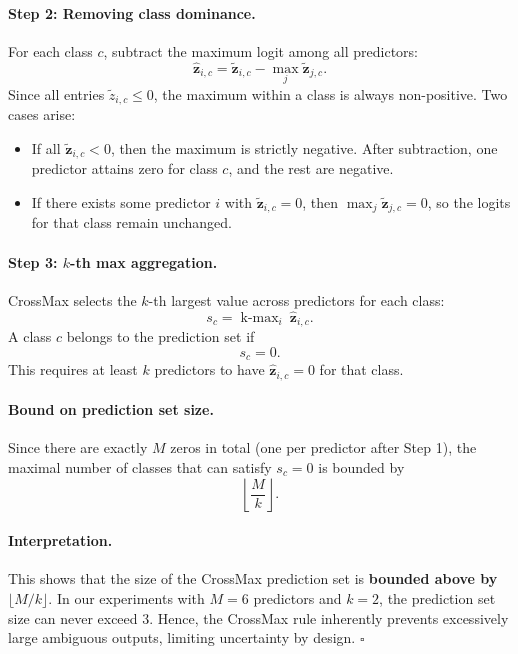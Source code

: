 \paragraph{Step 2: Removing class dominance.}  
For each class $c$, subtract the maximum logit among all predictors:
\[
\hat{\mathbf{z}}_{i,c} = \tilde{\mathbf{z}}_{i,c} - \max_{j} \tilde{\mathbf{z}}_{j,c}.
\]
Since all entries $\tilde{z}_{i,c} \leq 0$, the maximum within a class is always non-positive. Two cases arise:
\begin{itemize}
    \item If all $\tilde{\mathbf{z}}_{i,c} < 0$, then the maximum is strictly negative. After subtraction, one predictor attains zero for class $c$, and the rest are negative.
    \item If there exists some predictor $i$ with $\tilde{\mathbf{z}}_{i,c}=0$, then $\max_j \tilde{\mathbf{z}}_{j,c}=0$, so the logits for that class remain unchanged.
\end{itemize}

\paragraph{Step 3: $k$-th max aggregation.}  
CrossMax selects the $k$-th largest value across predictors for each class:
\[
s_c = \operatorname{k\text{-}max}_{i} \ \hat{\mathbf{z}}_{i,c}.
\]
A class $c$ belongs to the prediction set if
\[
s_c = 0.
\]
This requires at least $k$ predictors to have $\hat{\mathbf{z}}_{i,c} = 0$ for that class.

\paragraph{Bound on prediction set size.}  
Since there are exactly $M$ zeros in total (one per predictor after Step 1), the maximal number of classes that can satisfy $s_c=0$ is bounded by
\[
\left\lfloor \frac{M}{k} \right\rfloor.
\]

\paragraph{Interpretation.}  
This shows that the size of the CrossMax prediction set is \textbf{bounded above by} $\lfloor M/k \rfloor$.  
In our experiments with $M=6$ predictors and $k=2$, the prediction set size can never exceed $3$.  
Hence, the CrossMax rule inherently prevents excessively large ambiguous outputs, limiting uncertainty by design.
\hfill $\square$

